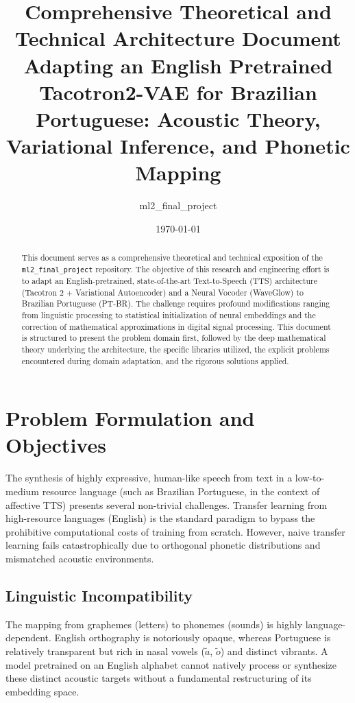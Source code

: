 \documentclass[12pt]{article}
\title{\textbf{Comprehensive Theoretical and Technical Architecture Document}\\ \Large Adapting an English Pretrained Tacotron2-VAE for Brazilian Portuguese: Acoustic Theory, Variational Inference, and Phonetic Mapping}
\author{ml2\_final\_project}
\date{\today}
\newcommand{\pathtt}[1]{\texttt{#1}}
\begin{document}
\maketitle

\begin{abstract}
This document serves as a comprehensive theoretical and technical exposition of the \pathtt{ml2\_final\_project} repository. The objective of this research and engineering effort is to adapt an English-pretrained, state-of-the-art Text-to-Speech (TTS) architecture (Tacotron 2 + Variational Autoencoder) and a Neural Vocoder (WaveGlow) to Brazilian Portuguese (PT-BR). The challenge requires profound modifications ranging from linguistic processing to statistical initialization of neural embeddings and the correction of mathematical approximations in digital signal processing. This document is structured to present the problem domain first, followed by the deep mathematical theory underlying the architecture, the specific libraries utilized, the explicit problems encountered during domain adaptation, and the rigorous solutions applied.
\end{abstract}

\tableofcontents
\newpage

\section{Problem Formulation and Objectives}

The synthesis of highly expressive, human-like speech from text in a low-to-medium resource language (such as Brazilian Portuguese, in the context of affective TTS) presents several non-trivial challenges. Transfer learning from high-resource languages (English) is the standard paradigm to bypass the prohibitive computational costs of training from scratch. However, naive transfer learning fails catastrophically due to orthogonal phonetic distributions and mismatched acoustic environments.

\subsection{Linguistic Incompatibility}
The mapping from graphemes (letters) to phonemes (sounds) is highly language-dependent. English orthography is notoriously opaque, whereas Portuguese is relatively transparent but rich in nasal vowels ($\tilde{a}$, $\tilde{o}$) and distinct vibrants. A model pretrained on an English alphabet cannot natively process or synthesize these distinct acoustic targets without a fundamental restructuring of its embedding space.
\end{document}
